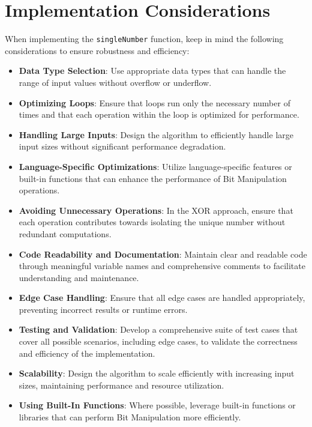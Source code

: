 \section*{Implementation Considerations}

When implementing the \texttt{singleNumber} function, keep in mind the following considerations to ensure robustness and efficiency:

\begin{itemize}
    \item \textbf{Data Type Selection}: Use appropriate data types that can handle the range of input values without overflow or underflow.
    
    \item \textbf{Optimizing Loops}: Ensure that loops run only the necessary number of times and that each operation within the loop is optimized for performance.
    
    \item \textbf{Handling Large Inputs}: Design the algorithm to efficiently handle large input sizes without significant performance degradation.
    
    \item \textbf{Language-Specific Optimizations}: Utilize language-specific features or built-in functions that can enhance the performance of Bit Manipulation operations.
    
    \item \textbf{Avoiding Unnecessary Operations}: In the XOR approach, ensure that each operation contributes towards isolating the unique number without redundant computations.
    
    \item \textbf{Code Readability and Documentation}: Maintain clear and readable code through meaningful variable names and comprehensive comments to facilitate understanding and maintenance.
    
    \item \textbf{Edge Case Handling}: Ensure that all edge cases are handled appropriately, preventing incorrect results or runtime errors.
    
    \item \textbf{Testing and Validation}: Develop a comprehensive suite of test cases that cover all possible scenarios, including edge cases, to validate the correctness and efficiency of the implementation.
    
    \item \textbf{Scalability}: Design the algorithm to scale efficiently with increasing input sizes, maintaining performance and resource utilization.
    
    \item \textbf{Using Built-In Functions}: Where possible, leverage built-in functions or libraries that can perform Bit Manipulation more efficiently.
\end{itemize}

